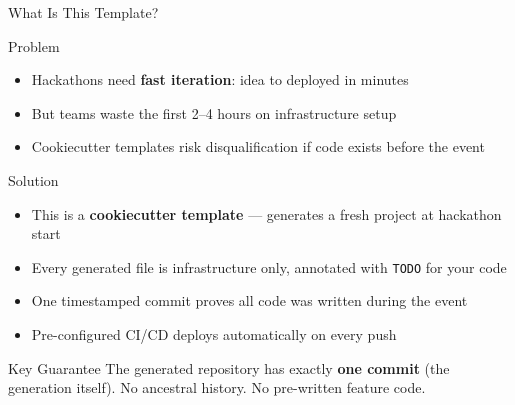 \documentclass[10pt,aspectratio=169,t]{beamer}
\begin{document}
\begin{frame}{What Is This Template?}

  \begin{block}{Problem}
    \begin{itemize}
      \item Hackathons need \textbf{fast iteration}: idea to deployed in minutes
      \item But teams waste the first 2--4 hours on infrastructure setup
      \item Cookiecutter templates risk disqualification if code exists before the event
    \end{itemize}
  \end{block}

  \vfill

  \begin{block}{Solution}
    \begin{itemize}
      \item This is a \textbf{cookiecutter template} --- generates a fresh project at hackathon start
      \item Every generated file is \alert{infrastructure only}, annotated with \texttt{TODO} for your code
      \item One timestamped commit proves all code was written during the event
      \item Pre-configured CI/CD deploys automatically on every push
    \end{itemize}
  \end{block}

  \vfill

  \begin{alertblock}{Key Guarantee}
    The generated repository has exactly \textbf{one commit} (the generation itself).
    No ancestral history. No pre-written feature code.
  \end{alertblock}

\end{frame}
\end{document}
